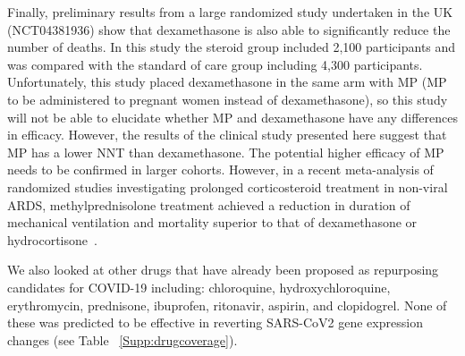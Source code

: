 Finally, preliminary results from a large randomized study undertaken in the UK \\(NCT04381936) show that dexamethasone is also able to significantly reduce the number of deaths. In this study the steroid group included 2,100 participants and was compared with the standard of care group including 4,300 participants. Unfortunately, this study placed dexamethasone in the same arm with MP (MP to be administered to pregnant women instead of dexamethasone), so this study will not be able to elucidate whether MP and dexamethasone have any differences in efficacy. However, the results of the clinical study presented here suggest that MP has a lower NNT than dexamethasone. The potential higher efficacy of MP needs to be confirmed in larger cohorts. However, in a recent meta-analysis of randomized studies investigating prolonged corticosteroid treatment in non-viral ARDS, methylprednisolone treatment achieved a reduction in duration of mechanical ventilation and mortality superior to that of dexamethasone or hydrocortisone~\cite{meduri2020pharmacological}.

We also looked at other drugs that have already been proposed as repurposing candidates for COVID-19 including: chloroquine, hydroxychloroquine, erythromycin, prednisone, ibuprofen, ritonavir, aspirin, and clopidogrel. None of these was predicted to be effective in reverting SARS-CoV2 gene expression changes (see Table ~\ref{Supp:drugcoverage}).

